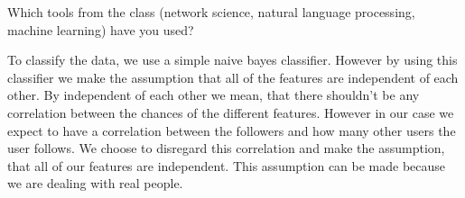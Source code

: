 Which tools from the class (network science, natural language processing, machine learning) have you used? 

To classify the data, we use a simple naive bayes classifier. However by using this classifier we make the assumption that all of the features are independent of each other. By independent of each other we mean, that there shouldn't be any correlation between the chances of the different features. However in our case we expect to have a correlation between the followers and how many other users the user follows. We choose to disregard this correlation and make the assumption, that all of our features are independent. This assumption can be made because we are dealing with real people.